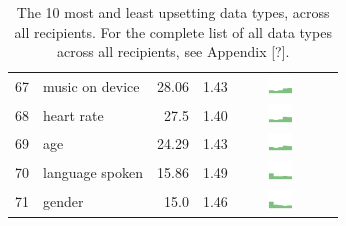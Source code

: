 \begin{table}[t]
\begin{center}
\begin{tabular}{| r | l | r | r | r | r |}
67 & music on device & 28.06 & 1.43 & \includegraphics[width = 2cm, height = 0.5cm]{tex-inputs/table-images/copiedanduploadedmusicfromyourdevicecombined} \\ 
68 & heart rate & 27.5 & 1.40 & \includegraphics[width = 2cm, height = 0.5cm]{tex-inputs/table-images/learnedyourheartratecombined} \\ 
69 & age & 24.29 & 1.43 &  \includegraphics[width = 2cm, height = 0.5cm]{tex-inputs/table-images/learnedyouragecombined} \\ 
70 & language spoken & 15.86 & 1.49 & \includegraphics[width = 2cm, height = 0.5cm]{tex-inputs/table-images/learnedthelanguageyouwerespeakingcombined} \\ 
71 & gender & 15.0 & 1.46 &  \includegraphics[width = 2cm, height = 0.5cm]{tex-inputs/table-images/learnedyourgendercombined} \\ 
\hline
\end{tabular}
\caption{The 10 most and least upsetting data types, across all recipients. For the complete list of all data types across all recipients, see Appendix [?].}
\label{top10-table}
\end{center}
\end{table}